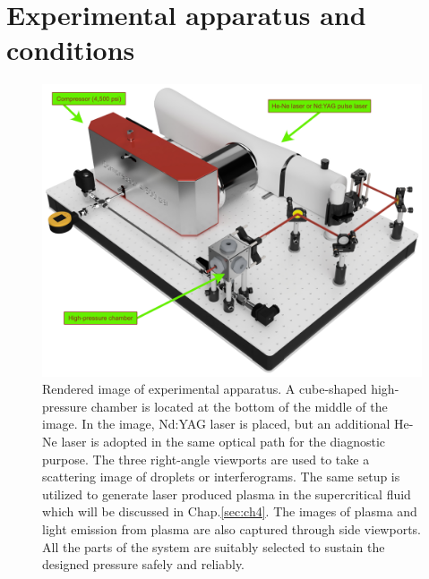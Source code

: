\section{Experimental apparatus and conditions}
\label{sec:ch2-2}

\begin{figure}[ht!]
\centering
\includegraphics[width=130mm]{figures/ch2/setup/render.pdf}
\caption{Rendered image of experimental apparatus. A cube-shaped high-pressure chamber is located at the bottom of the middle of the image. In the image, Nd:YAG laser is placed, but an additional He-Ne laser is adopted in the same optical path for the diagnostic purpose. The three right-angle viewports are used to take a scattering image of droplets or interferograms. The same setup is utilized to generate laser produced plasma in the supercritical fluid which will be discussed in Chap.\ref{sec:ch4}. The images of plasma and light emission from plasma are also captured through side viewports. All the parts of the system are suitably selected to sustain the designed pressure safely and reliably.}
\label{fig:render}
\end{figure}


